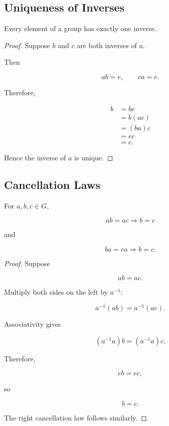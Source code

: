 \subsection{Uniqueness of Inverses}
\label{subsec:group-inverses-unique}

\begin{theorem}
Every element of a group has exactly one inverse.
\end{theorem}

\begin{proof}
Suppose \(b\) and \(c\) are both inverses of \(a\).

Then

\[ ab=e,\qquad ca=e. \]

Therefore,

\[
\begin{aligned}
b
&=be\\
&=b(ac)\\
&=(ba)c\\
&=ec\\
&=c.
\end{aligned}
\]

Hence the inverse of \(a\) is unique.
\end{proof}

\subsection{Cancellation Laws}
\label{subsec:group-cancellation-laws}

\begin{theorem}
For \(a,b,c\in G\),

\[ ab=ac\Longrightarrow b=c \]

and

\[ ba=ca\Longrightarrow b=c. \]
\end{theorem}

\begin{proof}
Suppose

\[ ab=ac. \]

Multiply both sides on the left by \(a^{-1}\):

\[ a^{-1}(ab)=a^{-1}(ac). \]

Associativity gives

\[ (a^{-1}a)b=(a^{-1}a)c. \]

Therefore,

\[ eb=ec, \]

so

\[ b=c. \]

The right cancellation law follows similarly.
\end{proof}

